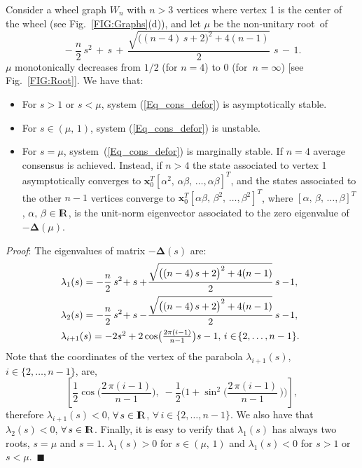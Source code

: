 \documentclass[letterpaper,9pt,twocolumn]{autart}
\newcommand{\rr}{\mathop{{\rm I}\mskip-4.0mu{\rm R}}\nolimits}
\newcommand{\vet}[1]{\ensuremath{{\mathbf #1}}}
\begin{document}
\begin{proposition}
Consider a wheel graph $W_{n}$ with $n > 3$ vertices where vertex 1 is the center of the wheel (see Fig.~\ref{FIG:Graphs}(d)),
and let $\mu$ be the non-unitary root~of\vspace{-0.15cm}
\begin{equation}\label{Eq:root_mu}
\!-\frac{n}{2}\,s^2 \,+\, s \,+\, \frac{\sqrt{\big((n-4)\,s +
    2\big)^2 + 4(n-1)}}{2}\,\,s \,-\, 1. \end{equation}
$\mu$ monotonically decreases from $1/2$ (for $n = 4$) to $0$ (for~$n = \infty$) [see Fig.~\ref{FIG:Root}].
We have that:
\begin{itemize}
\item For $s > 1$ or $s < \mu$, system (\ref{Eq_cons_defor}) is asymptotically stable.
\item For $s \in (\mu,\,1)$, system (\ref{Eq_cons_defor}) is unstable.
\item For $s = \mu$, system~(\ref{Eq_cons_defor}) is marginally
stable. If $n = 4$ average consensus is achieved. Instead, if $n > 4$
the state associated to vertex 1 asymptotically converges to
$\vet{x}^T_0[\alpha^2,\,\alpha\beta,\,\ldots,\alpha \beta]^T$, and the
states associated to the other $n-1$ vertices converge to $\vet{x}^T_0[\alpha\beta,\,\beta^2,\,\ldots,\beta^2]^T$,
where $[\alpha,\,\beta,\,\ldots,\beta]^T$, $\alpha,\,\beta \in \rr$, is
the unit-norm eigenvector associated to the zero eigenvalue of~$-\boldsymbol{\Delta}(\mu)$.
\end{itemize}
\emph{Proof}:
The eigenvalues of matrix $-\boldsymbol{\Delta}(s)$ are:
$$
\begin{array}{l}
\!\!\displaystyle\lambda_{1}(s) = -\frac{n}{2}\,s^2 \!+ s + \!\frac{\sqrt{\big((n-4)\,s +
    2\big)^2 + 4(n-1)}}{2}\,s - \!1,\vspace{0.16cm}\\
\!\!\displaystyle\lambda_{2}(s) = -\frac{n}{2}\,s^2 \!+ s - \!\frac{\sqrt{\big((n-4)\,s +
    2\big)^2 + 4(n-1)}}{2}\,s - \!1,\vspace{0.16cm}\\
\!\!\lambda_{i+1}(s) = -2s^2 + 2\cos\!\big(\frac{2\pi(i-1)}{n-1}\big)s - 1,\, i \in \!\{2,\ldots,n-1\}.
\end{array}
$$
Note that the coordinates of the vertex of the
parabola $\lambda_{i+1}(s)$, $i \in \!\{2,\ldots,n-1\}$, are,
$$
\left[\frac{1}{2}\cos\!\Big(\frac{2\,\pi (i-1)}{n-1}\Big),\;-\frac{1}{2}\Big(1 +\sin^2\!\Big(\frac{2\,\pi (i-1)}{n-1}\,\Big)\Big)\right],
$$
therefore $\lambda_{i+1}(s) < 0$, $\forall\, s \in \rr$, $\forall\, i \in \!\{2,\ldots,n-1\}$.
We also have that $\lambda_{2}(s) < 0$, $\forall\, s \in
\rr$. Finally, it is easy to verify that $\lambda_{1}(s)$ has always two roots,
$s = \mu$ and $s = 1$. $\lambda_{1}(s) > 0$ for $s \in (\mu,\,1)$ and $\lambda_{1}(s) < 0$
for $s > 1$ or~$s < \mu$.~\hfill$\blacksquare$
\end{proposition}
\end{document}
